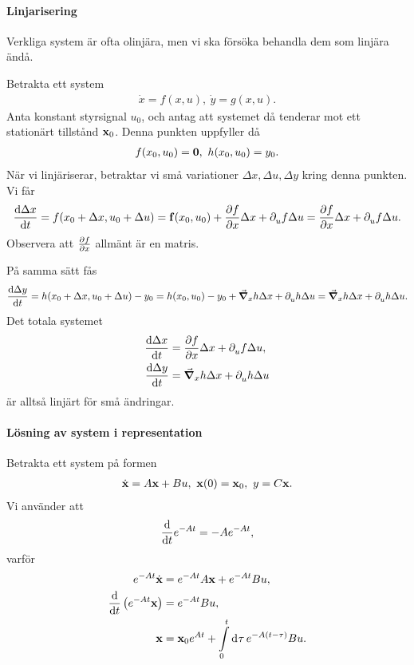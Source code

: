 \paragraph{Linjarisering}
Verkliga system är ofta olinjära, men vi ska försöka behandla dem som linjära ändå.

Betrakta ett system
\begin{align*}
	\dot{x} = f(x, u),\ \dot{y} = g(x, u).
\end{align*}
Anta konstant styrsignal $u_{0}$, och antag att systemet då tenderar mot ett stationärt tillstånd $\vb{x}_{0}$. Denna punkten uppfyller då
\begin{align*}
	f(x_{0}, u_{0}) = \vb{0},\ h(x_{0}, u_{0}) = y_{0}.
\end{align*}
När vi linjäriserar, betraktar vi små variationer $\Delta x, \Delta u, \Delta y$ kring denna punkten. Vi får
\begin{align*}
	\dv{\Delta x}{t} = f(x_{0} + \Delta x, u_{0} + \Delta u) = \vb{f}(x_{0}, u_{0}) + \pdv{f}{x}\Delta x + \partial_{u}^{}f\Delta u = \pdv{f}{x}\Delta x + \partial_{u}^{}f\Delta u.
\end{align*}
Observera att $\pdv{f}{x}$ allmänt är en matris.

På samma sätt fås
\begin{align*}
	\dv{\Delta y}{t} = h(x_{0} + \Delta x, u_{0} + \Delta u) - y_{0} = h(x_{0}, u_{0}) - y_{0} + \grad_{x}{h}\Delta x + \partial_{u}^{}h\Delta u = \grad_{x}{h}\Delta x + \partial_{u}^{}h\Delta u.
\end{align*}
Det totala systemet
\begin{align*}
	\dv{\Delta x}{t} &= \pdv{f}{x}\Delta x + \partial_{u}^{}f\Delta u, \\
	\dv{\Delta y}{t}     &= \grad_{x}{h}\Delta x + \partial_{u}^{}h\Delta u
\end{align*}
är alltså linjärt för små ändringar.

\paragraph{Lösning av system i representation}
Betrakta ett system på formen
\begin{align*}
	\dot{\vb{x}} = A\vb{x} + Bu,\ \vb{x}(0) = \vb{x}_{0},\ y = C\vb{x}.
\end{align*}
Vi använder att
\begin{align*}
	\dv{t}e^{-At} = -Ae^{-At},
\end{align*}
varför
\begin{align*}
	e^{-At}\dot{\vb{x}}              &= e^{-At}A\vb{x} + e^{-At}Bu, \\
	\dv{t}\left(e^{-At}\vb{x}\right) &= e^{-At}Bu, \\
	\vb{x}                           &= \vb{x}_{0}e^{At} + \int\limits_{0}^{t}\dd[]{\tau}e^{-A(t - \tau)}Bu.
\end{align*}

